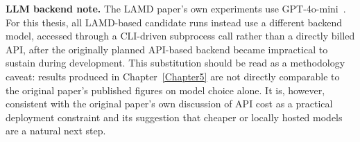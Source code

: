 \textbf{LLM backend note.} The LAMD paper's own experiments use
GPT-4o-mini~\cite{Qian2025-ua}. For this thesis, all LAMD-based candidate
runs instead use a different backend model, accessed through a CLI-driven
subprocess call rather than a directly billed API, after the originally
planned API-based backend became impractical to sustain during development.
This substitution should be read as a methodology caveat: results produced
in Chapter~\ref{Chapter5} are not directly comparable to the original
paper's published figures on model choice alone. It is, however, consistent
with the original paper's own discussion of API cost as a practical
deployment constraint and its suggestion that cheaper or locally hosted
models are a natural next step.

